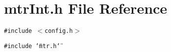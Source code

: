 \section{mtr\-Int.h File Reference}
\label{mtrInt_8h}
{\tt \#include $<$config.h$>$}\par
{\tt \#include \char`\"{}mtr.h\char`\"{}}\par
